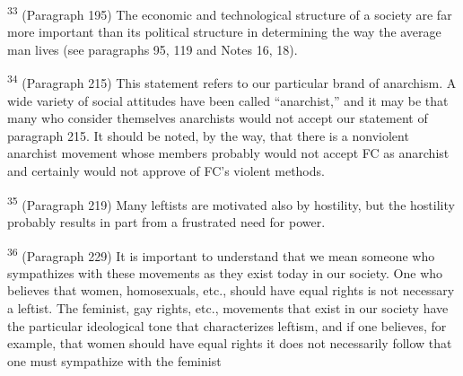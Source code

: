 \documentclass{article}
\begin{document}
\textsuperscript{33} (Paragraph 195) The economic and technological structure of a society are far more important 
than its political structure in determining the way the average man lives (see paragraphs 95, 119 
and Notes 16, 18). \vspace{\baselineskip}

\textsuperscript{34} (Paragraph 215) This statement refers to our particular brand of anarchism.  A wide variety of social 
attitudes have been called “anarchist,” and it may be that many who consider themselves anarchists would 
not accept our statement of paragraph 215. It should be noted, by the way, that there is a nonviolent 
anarchist movement whose members probably would not accept FC as anarchist and certainly would not 
approve of FC’s violent methods. \vspace{\baselineskip}

\textsuperscript{35} (Paragraph 219) Many leftists are motivated also by hostility, but the hostility probably results 
in part from a frustrated need for power. \vspace{\baselineskip}

\textsuperscript{36} (Paragraph 229) It is important to understand that we mean someone who sympathizes with 
these movements as they exist today in our society.  One who believes that women, 
homosexuals, etc., should have equal rights is not necessary a leftist.  The feminist, gay rights, 
etc., movements that exist in our society have the particular ideological tone that characterizes 
leftism, and if one believes, for example, that women should have equal rights it does not 
necessarily follow that one must sympathize with the feminist
\end{document}
